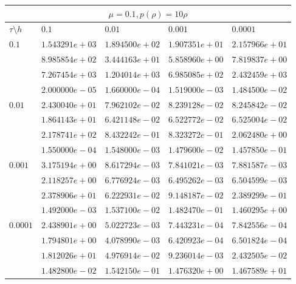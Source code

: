 \documentclass[12pt,a4paper]{article}
\begin{document}
\begin{tabular}{ |l|l|l|l|l| }
    \hline
    \multicolumn{5}{|c|}{$\mu = 0.1, p(\rho)  = 10\rho$}\\
    \hline
    $\tau\setminus h$ & $0.1$ & $0.01$ & $0.001$ & $0.0001$\\
    \hline
    $0.1$ & $1.543291e+03$ & $1.894500e+02$ & $1.907351e+01$ & $2.157966e+01$ \\
    & $8.985854e+02$ & $3.444163e+01$ & $5.858960e+00$ & $7.819837e+00$ \\
    & $7.267454e+03$ & $1.204014e+03$ & $6.985085e+02$ & $2.432459e+03$ \\
    & $2.000000e-05$ & $1.660000e-04$ & $1.519000e-03$ & $1.484500e-02$ \\
    \hline
    $0.01$ & $2.430040e+01$ & $7.962102e-02$ & $8.239128e-02$ & $8.245842e-02$ \\
    & $1.864143e+01$ & $6.421148e-02$ & $6.522772e-02$ & $6.525004e-02$ \\
    & $2.178741e+02$ & $8.432242e-01$ & $8.323272e-01$ & $2.062480e+00$ \\
    & $1.550000e-04$ & $1.548000e-03$ & $1.479600e-02$ & $1.457850e-01$ \\
    \hline
    $0.001$ & $3.175194e+00$ & $8.617294e-03$ & $7.841021e-03$ & $7.881587e-03$ \\
    & $2.118257e+00$ & $6.776924e-03$ & $6.495262e-03$ & $6.504599e-03$ \\
    & $2.378906e+01$ & $6.222931e-02$ & $9.148187e-02$ & $2.389299e-01$ \\
    & $1.492000e-03$ & $1.537100e-02$ & $1.482470e-01$ & $1.460295e+00$ \\
    \hline
    $0.0001$ & $2.438901e+00$ & $5.022723e-03$ & $7.443231e-04$ & $7.842556e-04$ \\
    & $1.794801e+00$ & $4.078990e-03$ & $6.420923e-04$ & $6.501824e-04$ \\
    & $1.812026e+01$ & $4.976914e-02$ & $9.236014e-03$ & $2.432505e-02$ \\
    & $1.482800e-02$ & $1.542150e-01$ & $1.476320e+00$ & $1.467589e+01$ \\
    \hline
\end{tabular}
\end{document}
